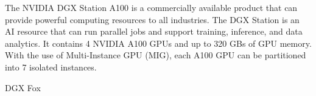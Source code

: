 \documentclass[sigplan,screen]{format/acmart}
\begin{document}
The NVIDIA DGX Station A100 is a commercially available product that can provide powerful computing resources to all industries. The DGX Station is an AI resource that can run parallel jobs and support training, inference, and data analytics. It contains 4 NVIDIA A100 GPUs and up to 320 GBs of GPU memory. With the use of Multi-Instance GPU (MIG), each A100 GPU can be partitioned into 7 isolated instances.

DGX Fox \cite{www-dgx-station-a100}

\newcommand{\nvidia}[1]{
    \ifthenelse{\equal{#1}{A100}}{\href{https://www.nvidia.com/en-us/data-center/a100/}{NVIDIA #1}}{} 
    \ifthenelse{\equal{#1}{V100}}{\href{https://www.nvidia.com/en-us/data-center/a100/}{NVIDIA #1}}{}
    \ifthenelse{\equal{#1}{K80}}{\href{https://www.nvidia.com/en-gb/data-center/tesla-k80/}{NVIDIA #1}}{}
    \ifthenelse{\equal{#1}{P100}}{\href{https://www.nvidia.com/en-us/data-center/tesla-p100/}{NVIDIA #1}}{}
    \ifthenelse{\equal{#1}{RTX3090}}{\href{https://www.nvidia.com/en-us/geforce/graphics-cards/30-series/rtx-3090/}{NVIDIA #1}}{}
    \ifthenelse{\equal{#1}{RTX2080TI}}{\href{https://www.nvidia.com/en-us/data-center/tesla-p100/}{NVIDIA #1}}{}


}
\end{document}
